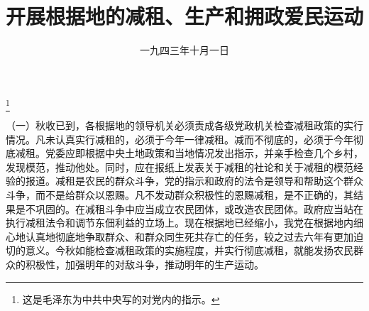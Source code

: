 
\title{开展根据地的减租、生产和拥政爱民运动}
\date{一九四三年十月一日}
\thanks{这是毛泽东为中共中央写的对党内的指示。}
\maketitle


（一）秋收已到，各根据地的领导机关必须责成各级党政机关检查减租政策的实行情况。凡未认真实行减租的，必须于今年一律减租。减而不彻底的，必须于今年彻底减租。党委应即根据中央土地政策和当地情况发出指示，并亲手检查几个乡村，发现模范，推动他处。同时，应在报纸上发表关于减租的社论和关于减租的模范经验的报道。减租是农民的群众斗争，党的指示和政府的法令是领导和帮助这个群众斗争，而不是给群众以恩赐。凡不发动群众积极性的恩赐减租，是不正确的，其结果是不巩固的。在减租斗争中应当成立农民团体，或改造农民团体。政府应当站在执行减租法令和调节东佃利益的立场上。现在根据地已经缩小，我党在根据地内细心地认真地彻底地争取群众、和群众同生死共存亡的任务，较之过去六年有更加迫切的意义。今秋如能检查减租政策的实施程度，并实行彻底减租，就能发扬农民群众的积极性，加强明年的对敌斗争，推动明年的生产运动。

